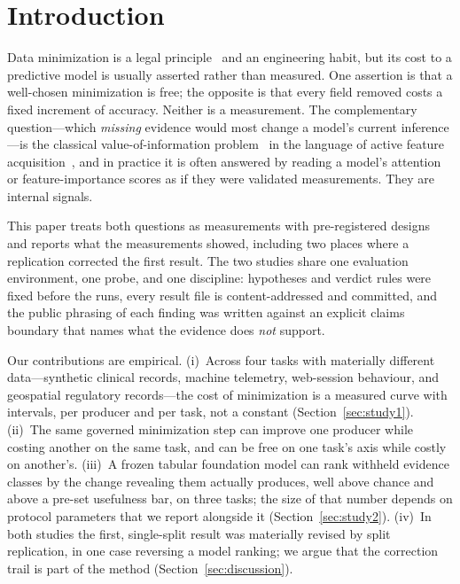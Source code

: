 \documentclass[11pt]{article}
\begin{document}
\section{Introduction}

Data minimization is a legal principle~\citep{gdpr} and an engineering habit, but its cost to a predictive model is usually asserted rather than measured. One assertion is that a well-chosen minimization is free; the opposite is that every field removed costs a fixed increment of accuracy. Neither is a measurement. The complementary question---which \emph{missing} evidence would most change a model's current inference---is the classical value-of-information problem~\citep{howard1966} in the language of active feature acquisition~\citep{saartsechansky2009,shim2018}, and in practice it is often answered by reading a model's attention or feature-importance scores as if they were validated measurements. They are internal signals.

This paper treats both questions as measurements with pre-registered designs and reports what the measurements showed, including two places where a replication corrected the first result. The two studies share one evaluation environment, one probe, and one discipline: hypotheses and verdict rules were fixed before the runs, every result file is content-addressed and committed, and the public phrasing of each finding was written against an explicit claims boundary that names what the evidence does \emph{not} support.

Our contributions are empirical. (i)~Across four tasks with materially different data---synthetic clinical records, machine telemetry, web-session behaviour, and geospatial regulatory records---the cost of minimization is a measured curve with intervals, per producer and per task, not a constant (Section~\ref{sec:study1}). (ii)~The same governed minimization step can improve one producer while costing another on the same task, and can be free on one task's axis while costly on another's. (iii)~A frozen tabular foundation model can rank withheld evidence classes by the change revealing them actually produces, well above chance and above a pre-set usefulness bar, on three tasks; the size of that number depends on protocol parameters that we report alongside it (Section~\ref{sec:study2}). (iv)~In both studies the first, single-split result was materially revised by split replication, in one case reversing a model ranking; we argue that the correction trail is part of the method (Section~\ref{sec:discussion}).
\end{document}
